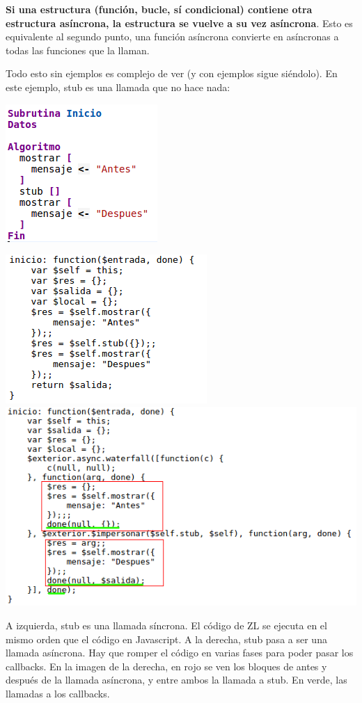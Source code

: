 \documentclass{report}
\begin{document}
	\vspace{10px}
	\noindent
	\textbf{Si una estructura (función, bucle, sí condicional) contiene otra estructura asíncrona, la estructura se vuelve a su vez asíncrona}. Esto es equivalente al segundo punto, una función asíncrona convierte en asíncronas a todas las funciones que la llaman.
	
	Todo esto sin ejemplos es complejo de ver (y con ejemplos sigue siéndolo). En este ejemplo, stub es una llamada que no hace nada:
	
	\begin{center}
	\includegraphics{asincrono}
	\end{center}

	\begin{center}
	\includegraphics[width=0.45\linewidth]{asincrono3}
	\includegraphics[width=0.45\linewidth]{asincrono2}
	
	A izquierda, stub es una llamada síncrona. El código de ZL se ejecuta en el mismo orden que el código en Javascript. A la derecha, stub pasa a ser una llamada asíncrona. Hay que romper el código en varias fases para poder pasar los callbacks. En la imagen de la derecha, en rojo se ven los bloques de antes y después de la llamada asíncrona, y entre ambos la llamada a stub. En verde, las llamadas a los callbacks.
	\end{center}
\end{document}
